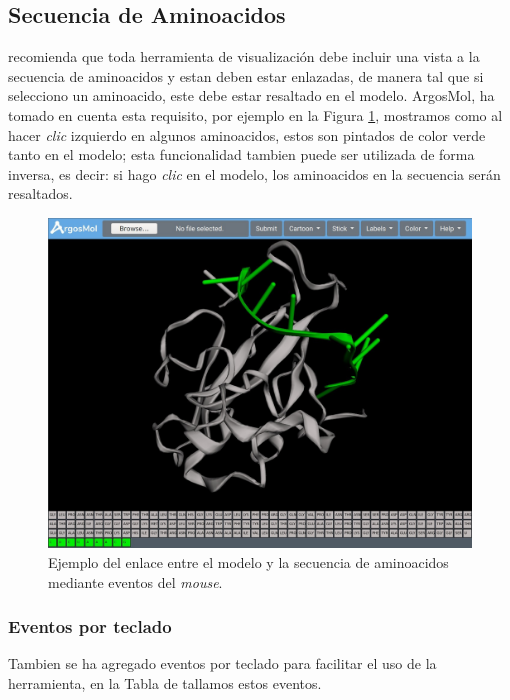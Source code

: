\documentclass{article}
\begin{document}
\subsection{Secuencia de Aminoacidos}

\cite{youkharibache2017twelve} recomienda que toda herramienta de visualización debe incluir una vista a la secuencia de aminoacidos y estan deben estar enlazadas, de manera tal que si selecciono un aminoacido, este debe estar resaltado en el modelo. ArgosMol, ha tomado en cuenta esta requisito, por ejemplo en la Figura \ref{fig:clic}, mostramos como al hacer \textit{clic} izquierdo en algunos aminoacidos, estos son pintados de color verde tanto en el modelo; esta funcionalidad tambien puede ser utilizada de forma inversa, es decir: si hago \textit{clic} en el modelo, los aminoacidos en la secuencia serán resaltados.

\begin{figure}[H]
	\centering
	\includegraphics[width=\textwidth]{img/argosmol/mol12}
	\caption{ Ejemplo del enlace entre el modelo y la secuencia de aminoacidos mediante eventos del \textit{mouse}. }
	\label{fig:clic}
\end{figure}

\subsubsection{Eventos por teclado}

Tambien se ha agregado eventos por teclado para facilitar el uso de la herramienta, en la Tabla de tallamos estos eventos.
\end{document}
